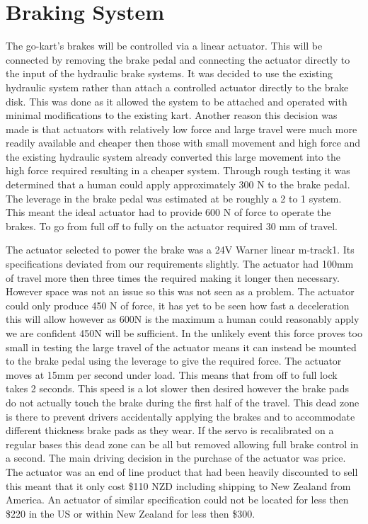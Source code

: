 \section{Braking System}

The go-kart's brakes will be controlled via a linear actuator. This will be
connected by removing the brake pedal and connecting the actuator directly to
the input of the hydraulic brake systems. It was decided to use the existing
hydraulic system rather than attach a controlled actuator directly to the brake
disk. This was done as it allowed the system to be attached and operated with
minimal modifications to the existing kart. Another reason this decision was
made is that actuators with relatively low force and large travel were much more
readily available and cheaper then those with small movement and high force and
the existing hydraulic system already converted this large movement into the
high force required resulting in a cheaper system. Through rough testing it was
determined that a human could apply approximately 300 N to the brake pedal. The
leverage in the brake pedal was estimated at be roughly a 2 to 1 system. This
meant the ideal actuator had to provide 600 N of force to operate the brakes. To
go from full off to fully on the actuator required 30 mm of travel.

The actuator selected to power the brake was a 24V Warner linear m-track1. Its
specifications deviated from our requirements slightly. The actuator had 100mm
of travel more then three times the required making it longer then necessary.
However space was not an issue so this was not seen as a problem. The actuator
could only produce 450 N of force, it has yet to be seen how fast a deceleration
this will allow however as 600N is the maximum a human could reasonably apply we
are confident 450N will be sufficient. In the unlikely event this force proves
too small in testing the large travel of the actuator means it can instead be
mounted to the brake pedal using the leverage to give the required force. The
actuator moves at 15mm per second under load. This means that from off to full
lock takes 2 seconds. This speed is a lot slower then desired however the brake
pads do not actually touch the brake during the first half of the travel. This
dead zone is there to prevent drivers accidentally applying the brakes and to
accommodate different thickness brake pads as they wear. If the servo is
recalibrated on a regular bases this dead zone can be all but removed allowing
full brake control in a second. The main driving decision in the purchase of the
actuator was price. The actuator was an end of line product that had been
heavily discounted to sell this meant that it only cost \$110 NZD including
shipping to New Zealand from America. An actuator of similar specification could
not be located for less then \$220 in the US or within New Zealand for less then
\$300.

